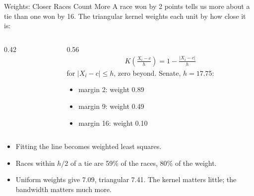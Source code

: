 \documentclass[aspectratio=169,11pt,xcolor=dvipsnames]{beamer}
\begin{document}
\begin{frame}{Weights: Closer Races Count More}
A race won by 2 points tells us more about a tie than one won by 16. The
\alert{triangular kernel} weights each unit by how close it is:
\begin{columns}[T]
\begin{column}{0.42\textwidth}
\begin{center}
\end{center}
\end{column}
\begin{column}{0.56\textwidth}
\begin{align*}
  K\!\left(\frac{X_i-c}{h}\right) = 1 - \frac{|X_i - c|}{h}
\end{align*}
for $|X_i - c| \leq h$, zero beyond. Senate, $h = 17.75$:
\begin{itemize}\itemsep1pt
  \item margin 2: weight 0.89
  \item margin 9: weight 0.49
  \item margin 16: weight 0.10
\end{itemize}
\end{column}
\end{columns}
\vskip0pt
\begin{itemize}\itemsep1pt
  \item Fitting the line becomes weighted least squares.
  \item Races within $h/2$ of a tie are 59\% of the races, 80\% of the weight.
  \item Uniform weights give 7.09, triangular 7.41. \alert{The kernel matters
        little; the bandwidth matters much more.}
\end{itemize}
\end{frame}
\end{document}
